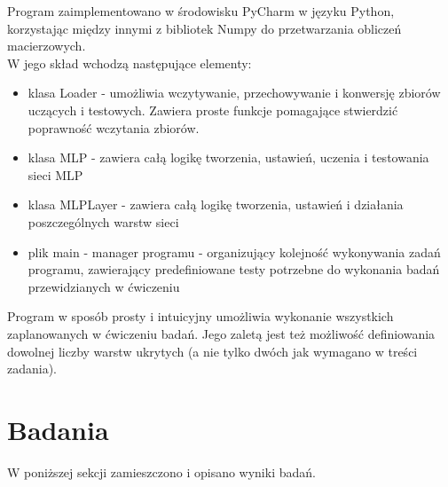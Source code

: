 \documentclass[17pt]{article}
\begin{document}
Program zaimplementowano w środowisku PyCharm w języku Python, korzystając między innymi z bibliotek Numpy do przetwarzania obliczeń macierzowych.\\

W jego skład wchodzą następujące elementy:
\begin{itemize}
\item klasa Loader - umożliwia wczytywanie, przechowywanie i konwersję zbiorów uczących i testowych. Zawiera proste funkcje pomagające stwierdzić poprawność wczytania zbiorów.
\item klasa MLP - zawiera całą logikę tworzenia, ustawień, uczenia i testowania sieci MLP
\item klasa MLPLayer - zawiera całą logikę tworzenia, ustawień i działania poszczególnych warstw sieci
\item plik main - manager programu - organizujący kolejność wykonywania zadań programu, zawierający predefiniowane testy potrzebne do wykonania badań przewidzianych w ćwiczeniu
\end{itemize}

Program w sposób prosty i intuicyjny umożliwia wykonanie wszystkich zaplanowanych w ćwiczeniu badań. Jego zaletą jest też możliwość definiowania dowolnej liczby warstw ukrytych (a nie tylko dwóch jak wymagano w treści zadania).

\section{Badania}
W poniższej sekcji zamieszczono i opisano wyniki badań.
\end{document}
